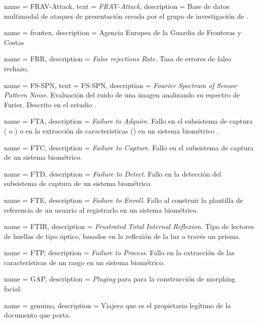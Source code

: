 {
    name        = {FRAV-Attack},
    text        = {\mbox{\textit{FRAV-Attack}}},
    description = {Base de datos multimodal de ataques de presentación creada por el grupo de investigación  de .}
}

{
    name        = {frontex},
    description = {Agencia Europea de la Guardia de Fronteras y Costas \cite{FRONTEXOnLine}}
}

{
    name        = FRR,
    description = {\textit{False rejections Rate}. Tasa de errores de falso rechazo,}
}

{
    name        = {FS-SPN},
    text        = \mbox{FS-SPN},
    description = {\textit{Fourier Spectrum of Sensor Pattern Noise}. Evaluación del ruido de una imagen analizando su espectro de Furier. Descrito en el estudio \cite{zhang2018face}.}
}

{
    name        = {FTA},
    description = {\textit{Failure to Adquire}. Fallo en el subsistema de captura ( o ) o en la extracción de caracteristicas () en un sistema biométrico .}
}

{
    name        = {FTC},
    description = {\textit{Failure to Capture}. Fallo en el subsistema de captura de un sistema biométrico.}
}

{
    name        = {FTD},
    description = {\textit{Failure to Detect}. Fallo en la detección del subsistema de captura de un sistema biométrico.}
}

{
    name        = {FTE},
    description = {\textit{Failure to Enroll}. Fallo al construir la plantilla de referencia de un usuario al registrarlo en un sistema biométrico.}
}

{
    name        = {FTIR},
    description = {\textit{Frustrated Total Internal Reflexion}. Tipo de lectores de huellas de tipo óptico, basados en la reflexión de la luz a través un prisma.}
}

{
    name        = {FTP},
    description = {\textit{Failure to Process}. Fallo en la extracción de las características de un rasgo en un sistema biométrico.}
}
   
{
    name        = {GAP},
    description = {\textit{Pluging} para  para la construcción de \gls{morphing} facial.}
}

{
    name        = {genuino},
    description = {Viajero que es el propietario legítimo de la documento que porta.}
}

